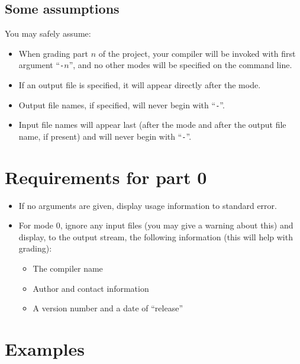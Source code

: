 \documentclass{article}
\begin{document}
\subsection{Some assumptions}


You may safely assume:
\begin{itemize}
  \item When grading part $n$ of the project,
        your compiler will be invoked with 
        first argument ``{\tt -}$n$'',
        and no other modes will be specified on the command line.

  \item If an output file is specified,
        it will appear directly after the mode.

  \item Output file names, if specified,
        will never begin with ``{\tt -}''.

  \item Input file names will appear last
        (after the mode and after the output file name, if present)
        and will never begin with ``{\tt -}''.

\end{itemize}


\section{Requirements for part 0}

\begin{itemize}
  \item If no arguments are given, display usage information to standard error.
  \item For mode 0, ignore any input files 
    (you may give a warning about this)
    and display, to the output stream,
    the following information
    (this will help with grading):
    \begin{itemize}
      \item The compiler name
      \item Author and contact information
      \item A version number and a date of ``release''
    \end{itemize}

\end{itemize}

\section{Examples}
\end{document}
